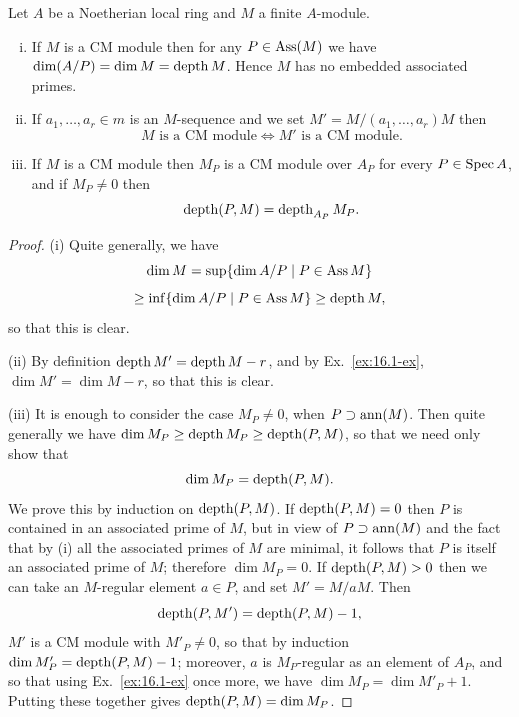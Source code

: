 \begin{theorem}\label{thm:17.3}
Let $A$ be a Noetherian local ring and $M$ a finite $A$-module.
\begin{enumerate}[(i)]
  \item If $M$ is a CM module then for any $P \in \operatorname{Ass}(M)$ we have
        $\dim(A/P) = \dim M = \operatorname{depth} M$. Hence $M$ has no embedded associated
        primes.
  \item If $a_1, \ldots, a_r \in m$ is an $M$-sequence and we set $M' = M/(a_1, \ldots, a_r)M$ then
        \[
          M \text{ is a CM module} \iff M' \text{ is a CM module}.
        \]
  \item If $M$ is a CM module then $M_P$ is a CM module over $A_P$ for
        every $P \in \operatorname{Spec} A$, and if $M_P \neq 0$ then
        \[
          \operatorname{depth} (P, M) = \operatorname{depth}_{A_P} M_P.
        \]
\end{enumerate}
\end{theorem}

\begin{proof}
(i) Quite generally, we have
\[
  \dim M = \sup\{\dim A/P \mid P \in \operatorname{Ass} M\}
\]
\[
  \ge \inf\{\dim A/P \mid P \in \operatorname{Ass} M\} \ge \operatorname{depth} M,
\]
so that this is clear.

(ii) By definition $\operatorname{depth} M' = \operatorname{depth} M - r$, and by Ex.~\ref{ex:16.1-ex}, $\dim M' =
\dim M - r$, so that this is clear.

(iii) It is enough to consider the case $M_P \neq 0$, when $P \supset \operatorname{ann}(M)$. Then
quite generally we have $\dim M_P \ge \operatorname{depth} M_P \ge \operatorname{depth}(P, M)$, so that we need
only show that
\[
  \dim M_P = \operatorname{depth} (P, M).
\]
We prove this by induction on $\operatorname{depth}(P, M)$. If $\operatorname{depth}(P, M) = 0$ then $P$ is
contained in an associated prime of $M$, but in view of $P \supset \operatorname{ann}(M)$ and
the fact that by (i) all the associated primes of $M$ are minimal, it follows
that $P$ is itself an associated prime of $M$; therefore $\dim M_P = 0$. If
$\operatorname{depth}(P, M) > 0$ then we can take an $M$-regular element $a \in P$, and set
$M' = M/aM$. Then
\[
  \operatorname{depth} (P, M') = \operatorname{depth} (P, M) - 1,
\]
$M'$ is a CM module with $M'_P \neq 0$, so that by induction $\dim M'_P =
\operatorname{depth}(P, M) - 1$; moreover, $a$ is $M_P$-regular as an element of $A_P$, and
so that using Ex.~\ref{ex:16.1-ex} once more, we have $\dim M_P =
\dim M'_P + 1$. Putting these together gives $\operatorname{depth} (P, M) = \dim M_P$.
\end{proof}

